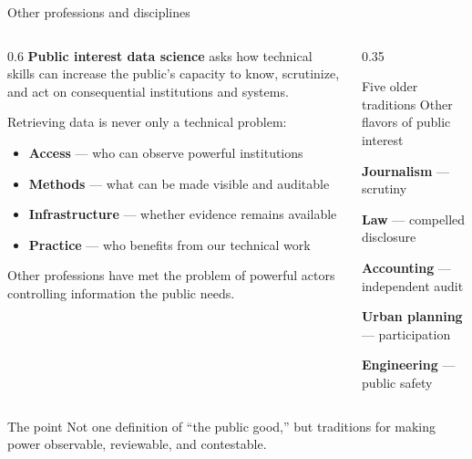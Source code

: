 \documentclass[9pt,aspectratio=169]{beamer}
\begin{document}
\begin{frame}{Other professions and disciplines}
    \begin{columns}[T]
        \begin{column}{0.6\textwidth}
            \textbf{Public interest data science} asks how technical skills can increase the public's capacity to know, scrutinize, and act on consequential institutions and systems.

            \medskip

            Retrieving data is never only a technical problem:

            \begin{itemize}\small
                \item \textbf{Access} --- who can observe powerful institutions
                \item \textbf{Methods} --- what can be made visible and auditable
                \item \textbf{Infrastructure} --- whether evidence remains available
                \item \textbf{Practice} --- who benefits from our technical work
            \end{itemize}

        Other professions have met the problem of powerful actors controlling information the public needs.
        
        \end{column}

        \begin{column}{0.35\textwidth}
            \begin{alertblock}{Five older traditions}
                \small
                Other flavors of public interest

                \medskip

                \textbf{Journalism} --- scrutiny

                \textbf{Law} --- compelled disclosure

                \textbf{Accounting} --- independent audit

                \textbf{Urban planning} --- participation

                \textbf{Engineering} --- public safety
            \end{alertblock}
        \end{column}
    \end{columns}

    \bigskip

    \begin{alertblock}{The point}
        \small
        Not one definition of ``the public good,'' but traditions for making power observable, reviewable, and contestable.
    \end{alertblock}
\end{frame}
\end{document}

